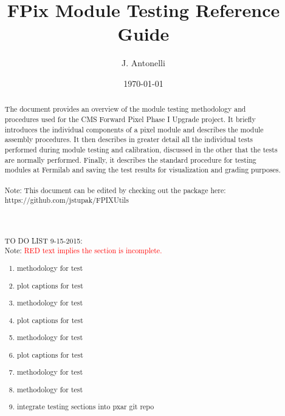 \documentclass{scrartcl}
\title{FPix Module Testing Reference Guide} %
\author{
J. Antonelli
} %
\date{\today} %
\begin{document}
\maketitle %


\begin{abstract}
The document provides an overview of the module testing methodology and procedures used for the CMS Forward Pixel Phase I Upgrade project. 
It briefly introduces the individual components of a pixel module and describes the module assembly procedures.
It then describes in greater detail all the individual tests performed during module testing and calibration, discussed in the other that the tests are normally performed. 
Finally, it describes the standard procedure for testing modules at Fermilab and saving the test results for visualization and grading purposes.
\\\\
Note: This document can be edited by checking out the package here: 
\\
https://github.com/jstupak/FPIXUtils
\\\\\\\\
TO DO LIST 9-15-2015:
\\
Note: \textcolor{red}{RED text implies the section is incomplete.}
\begin{enumerate}
\item methodology for \trimming test
\item plot captions \trimming for test

\item methodology for \phopt test
\item plot captions for \phopt test

\item methodology for \gainped test
\item plot captions for \gainped test

\item methodology for \scurves test

\item methodology for \bb test

\item integrate testing sections into pxar git repo
\end{enumerate}

\end{abstract}

\newpage
\tableofcontents

\newpage









%  
\end{document}
